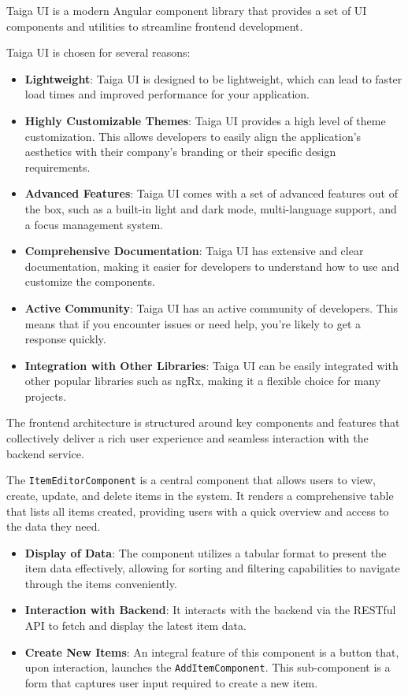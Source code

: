 
Taiga UI is a modern Angular component library that provides a set of UI components and utilities to streamline frontend development.

Taiga UI is chosen for several reasons:

\begin{itemize}
    \item \textbf{Lightweight}: Taiga UI is designed to be lightweight, which can lead to faster load times and improved performance for your application.
    \item \textbf{Highly Customizable Themes}: Taiga UI provides a high level of theme customization. This allows developers to easily align the application's aesthetics with their company's branding or their specific design requirements.
    \item \textbf{Advanced Features}: Taiga UI comes with a set of advanced features out of the box, such as a built-in light and dark mode, multi-language support, and a focus management system.
    \item \textbf{Comprehensive Documentation}: Taiga UI has extensive and clear documentation, making it easier for developers to understand how to use and customize the components.
    \item \textbf{Active Community}: Taiga UI has an active community of developers. This means that if you encounter issues or need help, you're likely to get a response quickly.
    \item \textbf{Integration with Other Libraries}: Taiga UI can be easily integrated with other popular libraries such as ngRx, making it a flexible choice for many projects.
\end{itemize}

The frontend architecture is structured around key components and features that collectively deliver a rich user experience and seamless interaction with the backend service.

The \texttt{ItemEditorComponent} is a central component that allows users to view, create, update, and delete items in the system.
It renders a comprehensive table that lists all items created, providing users with a quick overview and access to the data they need.

\begin{itemize}
    \item \textbf{Display of Data}: The component utilizes a tabular format to present the item data effectively, allowing for sorting and filtering capabilities to navigate through the items conveniently.
    \item \textbf{Interaction with Backend}: It interacts with the backend via the RESTful API to fetch and display the latest item data.
    \item \textbf{Create New Items}: An integral feature of this component is a button that, upon interaction, launches the \texttt{AddItemComponent}.
    This sub-component is a form that captures user input required to create a new item.
\end{itemize}

